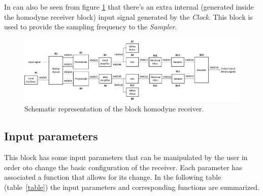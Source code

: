 In can also be seen from figure \ref{MQAM_receiver_block_diagram} that there's an extra internal (generated inside the homodyne receiver block) input signal generated by the \textit{Clock}. This block is used to provide the sampling frequency to the \textit{Sampler}.


\begin{figure}[h]
	\centering
	\includegraphics[width=\textwidth]{../lib/homodyne_receiver/figures/MQAM_receiver_block_diagram_20180206.png}
	\caption{Schematic representation of the block homodyne receiver.}\label{MQAM_receiver_block_diagram}
\end{figure}

\subsection*{Input parameters}

This block has some input parameters that can be manipulated by the user in order oto change the basic configuration of the receiver. Each parameter has associated a function that allows for its change. In the following table (table~\ref{table}) the input parameters and corresponding functions are summarized.


